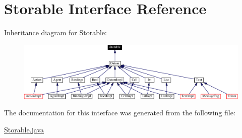 \hypertarget{interfaceStorable}{
\section{Storable  Interface Reference}
\label{interfaceStorable}
}
Inheritance diagram for Storable:\begin{figure}[H]
\begin{center}
\leavevmode
\includegraphics[width=344pt]{interfaceStorable__inherit__graph}
\end{center}
\end{figure}


The documentation for this interface was generated from the following file:\begin{CompactItemize}
\item 
\hyperlink{Storable_8java-source}{Storable.java}\end{CompactItemize}
